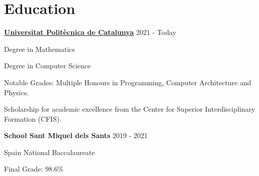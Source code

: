 \section{Education}
\textbf{\underline{Universitat Politècnica de Catalunya}} \hfill 2021 - Today

\vspace{-8pt}
\begin{multicols}{2}
Degree in Mathematics

Degree in Computer Science

\columnbreak
\setlength{\parindent}{0pt}Notable Grades: Multiple Honours in Programming, Computer Architecture and Physics.

\end{multicols}

\vspace{-8pt}\setlength{\parindent}{0pt}\setlength{\leftskip}{2em}
Scholarship for academic excellence from the Center for Superior Interdisciplinary Formation (CFIS).

\setlength{\leftskip}{0pt}

\vspace{5pt}
\setlength{\parindent}{0pt}\textbf{School Sant Miquel dels Sants} \hfill 2019 - 2021

\setlength{\parindent}{2em}

\vspace{-8pt}
\begin{multicols}{2}
Spain National Baccalaureate

\columnbreak
\setlength{\parindent}{0pt}Final Grade: 98.6\%
\end{multicols}



